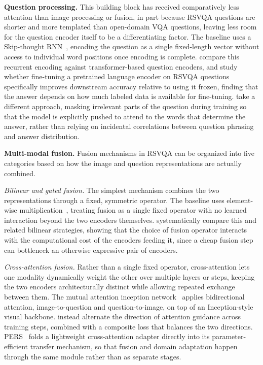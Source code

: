 \textbf{Question processing.} This building block has received comparatively less attention than image processing or fusion, in part because RSVQA questions are shorter and more templated than open-domain VQA questions, leaving less room for the question encoder itself to be a differentiating factor. The baseline uses a Skip-thought RNN~\cite{kiros2015skipthought}, encoding the question as a single fixed-length vector without access to individual word positions once encoding is complete. \textcite{chappuis2022a} compare this recurrent encoding against transformer-based question encoders, and study whether fine-tuning a pretrained language encoder on RSVQA questions specifically improves downstream accuracy relative to using it frozen, finding that the answer depends on how much labeled data is available for fine-tuning. \textcite{li2024maskbased} take a different approach, masking irrelevant parts of the question during training so that the model is explicitly pushed to attend to the words that determine the answer, rather than relying on incidental correlations between question phrasing and answer distribution.

\textbf{Multi-modal fusion.} Fusion mechanisms in RSVQA can be organized into five categories based on how the image and question representations are actually combined.

\textit{Bilinear and gated fusion.} The simplest mechanism combines the two representations through a fixed, symmetric operator. The baseline uses element-wise multiplication~\cite{lobry2020rsvqa}, treating fusion as a single fixed operator with no learned interaction beyond the two encoders themselves. \textcite{chappuis2021howtofind} systematically compare this and related bilinear strategies, showing that the choice of fusion operator interacts with the computational cost of the encoders feeding it, since a cheap fusion step can bottleneck an otherwise expressive pair of encoders.

\textit{Cross-attention fusion.} Rather than a single fixed operator, cross-attention lets one modality dynamically weight the other over multiple layers or steps, keeping the two encoders architecturally distinct while allowing repeated exchange between them. The mutual attention inception network~\cite{zheng2021mutual} applies bidirectional attention, image-to-question and question-to-image, on top of an Inception-style visual backbone. \textcite{feng2023alternate} instead alternate the direction of attention guidance across training steps, combined with a composite loss that balances the two directions. PERS~\cite{he2024pers} folds a lightweight cross-attention adapter directly into its parameter-efficient transfer mechanism, so that fusion and domain adaptation happen through the same module rather than as separate stages.


